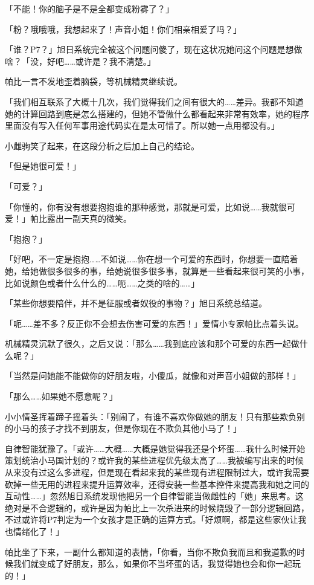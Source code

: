 「不能！你的脑子是不是全都变成粉雾了？」

「粉？哦哦哦，我想起来了！声音小姐！你们相亲相爱了吗？」

「谁？P7？」旭日系统完全被这个问题问傻了，现在这状况她问这个问题是想做啥？「没，好吧……或许是？我不清楚。」

帕比一言不发地歪着脑袋，等机械精灵继续说。

「我们相互联系了大概十几次，我们觉得我们之间有很大的……差异。我都不知道她的计算回路到底是怎么搭建的，但她不管做什么都看起来非常有效率，她的程序里面没有写入任何军事用途代码实在是太可惜了。所以她一点用都没有。」

小雌驹笑了起来，在这段分析之后加上自己的结论。

「但是她很可爱！」

「可爱？」

「你懂的，你有没有想要抱抱谁的那种感觉，那就是可爱，比如说……我就很可爱！」帕比露出一副天真的微笑。

「抱抱？」

「好吧，不一定是抱抱……不如说……你在想一个可爱的东西时，你想要一直陪着她，给她做很多很多的事，给她说很多很多事，就算是一些看起来很可笑的小事，比如说颜色或者什么什么的……呃……之类的啥的……」

「某些你想要陪伴，并不是征服或者奴役的事物？」旭日系统总结道。

「呃……差不多？反正你不会想去伤害可爱的东西！」爱情小专家帕比点着头说。

机械精灵沉默了很久，之后又说：「那么……我到底应该和那个可爱的东西一起做什么呢？」

「当然是问她能不能做你的好朋友啦，小傻瓜，就像和对声音小姐做的那样！」

「那么……如果她不愿意呢？」

小小情圣挥着蹄子摇着头：「别闹了，有谁不喜欢你做她的朋友！只有那些欺负别的小马的孩子才找不到朋友，但是你现在不欺负其他小马了！」

自律智能犹豫了。「或许……大概……大概是她觉得我还是个坏蛋……我什么时候开始策划统治小马国计划的？或许我的某些进程优先级太高了……我被编写出来的时候从来没有过这么多进程，但是现在看起来我的某些现有进程限制过大，或许我需要砍掉一些无用的进程来提升运算效率，还得安装一些基本控件来提高我和她之间的互动性……」忽然旭日系统发现他把另一个自律智能当做雌性的「她」来思考。这绝对是不合逻辑的，或许是因为帕比上一次杀进来的时候烧毁了一部分逻辑回路，不过或许将P7判定为一个女孩才是正确的运算方式。「好烦啊，都是这些家伙让我也情绪化了！」

帕比坐了下来，一副什么都知道的表情，「你看，当你不欺负我而且和我道歉的时候我们就变成了好朋友，那么，如果你不当坏蛋的话，我觉得她也会和你一起玩的！」

